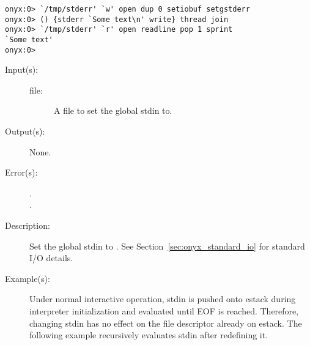 \begin{description}
\begin{description}
\begin{verbatim}
onyx:0> `/tmp/stderr' `w' open dup 0 setiobuf setgstderr
onyx:0> () {stderr `Some text\n' write} thread join
onyx:0> `/tmp/stderr' `r' open readline pop 1 sprint
`Some text'
onyx:0>
		\end{verbatim}
	\end{description}
\label{systemdict:setgstdin}
\item[{\onyxop{file}{setgstdin}{--}}: ]
	\begin{description}\item[]
	\item[Input(s): ]
		\begin{description}\item[]
		\item[file: ]
			A file to set the global stdin to.
		\end{description}
	\item[Output(s): ] None.
	\item[Error(s): ]
		\begin{description}\item[]
		\item[.]
		\item[.]
		\end{description}
	\item[Description: ]
		Set the global stdin to .  See
		Section~\ref{sec:onyx_standard_io} for standard I/O details.
	\item[Example(s): ]
		Under normal interactive operation, stdin is pushed onto estack
		during interpreter initialization and evaluated until EOF is
		reached.  Therefore, changing stdin has no effect on the file
		descriptor already on estack.  The following example recursively
		evaluates stdin after redefining it.
\begin{verbatim}


\end{verbatim}
\end{description}
\end{description}
